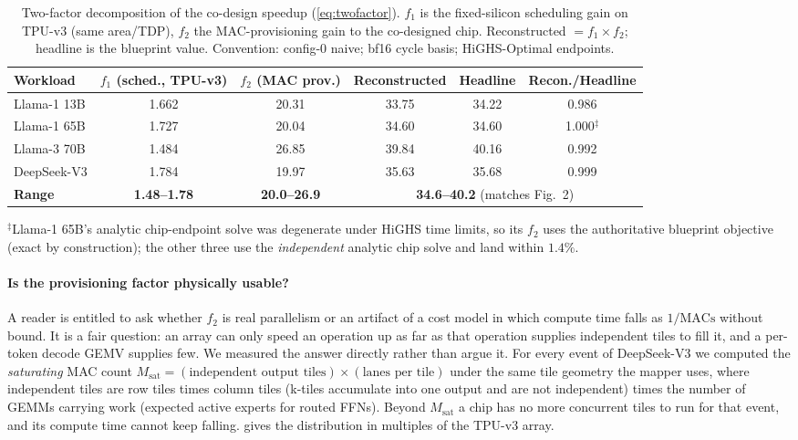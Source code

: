\begin{table}[ht!]
\centering
\caption{Two-factor decomposition of the co-design speedup
(\cref{eq:twofactor}). $f_1$ is the fixed-silicon scheduling gain on TPU-v3
(same area/TDP), $f_2$ the MAC-provisioning gain to the co-designed chip.
Reconstructed $=f_1\times f_2$; headline is the blueprint value. Convention:
config-0 naive; bf16 cycle basis; HiGHS-Optimal endpoints.}
\label{tab:deficit_twofactor}
\small
\begin{tabular}{@{}lccccc@{}}
\toprule
\textbf{Workload} & $f_1$ (sched., TPU-v3) & $f_2$ (MAC prov.)
& Reconstructed & Headline & Recon./Headline \\
\midrule
Llama-1 13B  & 1.662 & 20.31 & 33.75 & 34.22 & 0.986 \\
Llama-1 65B  & 1.727 & 20.04 & 34.60 & 34.60 & 1.000$^{\ddagger}$ \\
Llama-3 70B  & 1.484 & 26.85 & 39.84 & 40.16 & 0.992 \\
DeepSeek-V3  & 1.784 & 19.97 & 35.63 & 35.68 & 0.999 \\
\midrule
\textbf{Range} & \textbf{1.48--1.78} & \textbf{20.0--26.9}
& \multicolumn{3}{c}{\textbf{34.6--40.2} (matches Fig.~2)} \\
\bottomrule
\end{tabular}

\vspace{2pt}
{\footnotesize $^{\ddagger}$Llama-1 65B's analytic chip-endpoint solve was
degenerate under HiGHS time limits, so its $f_2$ uses the authoritative
blueprint objective (exact by construction); the other three use the
\emph{independent} analytic chip solve and land within $1.4\%$.}
\end{table}

\paragraph{Is the provisioning factor physically usable?}
A reader is entitled to ask whether $f_2$ is real parallelism or an artifact of
a cost model in which compute time falls as $1/\mathrm{MACs}$ without bound. It
is a fair question: an array can only speed an operation up as far as that
operation supplies independent tiles to fill it, and a per-token decode GEMV
supplies few. We measured the answer directly rather than argue it. For every
event of DeepSeek-V3 we computed the \emph{saturating} MAC count
$M_{\mathrm{sat}} = (\text{independent output tiles}) \times (\text{lanes per
tile})$ under the same tile geometry the mapper uses, where independent tiles
are row tiles times column tiles (k-tiles accumulate into one output and are
not independent) times the number of GEMMs carrying work (expected active
experts for routed FFNs). Beyond $M_{\mathrm{sat}}$ a chip has no more
concurrent tiles to run for that event, and its compute time cannot keep
falling.  gives the distribution in multiples of the TPU-v3
array.

